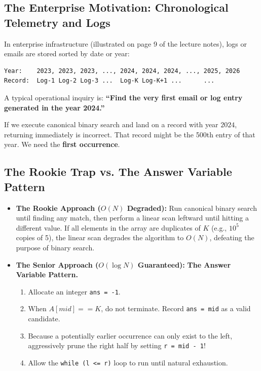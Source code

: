 \documentclass[10pt,journal,compsoc,onecolumn]{IEEEtran}
\begin{document}
\subsection{The Enterprise Motivation: Chronological Telemetry and Logs}

In enterprise infrastructure (illustrated on page 9 of the lecture notes), logs or emails are stored sorted by date or year:
\begin{verbatim}
Year:    2023, 2023, 2023, ..., 2024, 2024, 2024, ..., 2025, 2026
Record:  Log-1 Log-2 Log-3 ...  Log-K Log-K+1 ...      ...
\end{verbatim}
A typical operational inquiry is: \textbf{``Find the very first email or log entry generated in the year 2024.''}

If we execute canonical binary search and land on a record with year $2024$, returning immediately is incorrect. That record might be the 500th entry of that year. We need the \textbf{first occurrence}.

\subsection{The Rookie Trap vs. The Answer Variable Pattern}

\begin{itemize}
    \item \textbf{The Rookie Approach ($O(N)$ Degraded):} Run canonical binary search until finding any match, then perform a linear scan leftward until hitting a different value. If all elements in the array are duplicates of $K$ (e.g., $10^5$ copies of 5), the linear scan degrades the algorithm to $O(N)$, defeating the purpose of binary search.
    \item \textbf{The Senior Approach ($O(\log N)$ Guaranteed):} \textbf{The Answer Variable Pattern.}
    \begin{enumerate}
        \item Allocate an integer \texttt{ans = -1}.
        \item When $A[mid] == K$, do not terminate. Record \texttt{ans = mid} as a valid candidate.
        \item Because a potentially earlier occurrence can only exist to the left, aggressively prune the right half by setting \texttt{r = mid - 1}!
        \item Allow the \verb|while (l <= r)| loop to run until natural exhaustion.
    \end{enumerate}
\end{itemize}
\end{document}
